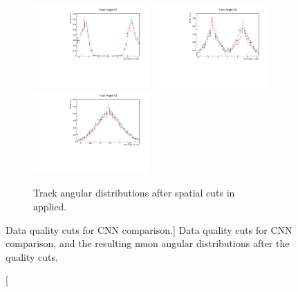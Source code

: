 \begin{figure}
	\begin{subfigure}[b]{\textwidth}
		\centering
		\vspace{0.5cm}
		\includegraphics[width=0.49\textwidth]{figures/angXY_cuts.pdf}
		\hfill
		\includegraphics[width=0.49\textwidth]{figures/angXZ_cuts.pdf}
		\includegraphics[width=0.49\textwidth]{figures/angYZ_cuts.pdf}
		\caption {Track angular distributions after spatial cuts in 
		 applied.}
		\label{fig:angular_dist}
	\end{subfigure}

	\caption 
	[Data quality cuts for CNN comparison.]
	{Data quality cuts for CNN comparison, and the resulting muon angular
	distributions after the quality cuts.}
	\label{fig:cnn_cuts_spatial}

\end{figure}

